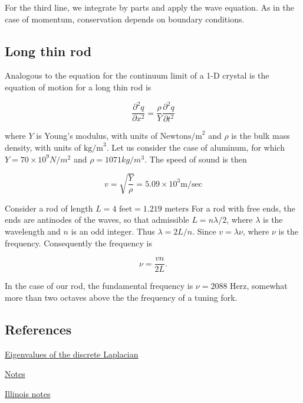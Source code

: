 For the third line, we integrate by parts and apply the wave equation.  As in the case of momentum, conservation depends on boundary conditions.

\subsection{Long thin rod}

Analogous to the equation for the continuum limit of a 1-D crystal is the equation of motion for a long thin rod is

\begin{equation}
\frac{\partial^2 q}{\partial x^2}
= \frac{\rho}{Y}\frac{\partial^2 q}{\partial t^2} 
\end{equation}

where $Y$ is Young's modulus, with units of $\text{Newtons/m}^2$ and
$\rho$ is the bulk mass density, with units of $\text{kg/m}^3$.  Let us consider the case of aluminum, for which $Y = 70\times 10^9 N/m^2$ and
$\rho = 1071 kg/m^3$.  The speed of sound is then

\begin{equation}
v = \sqrt{\frac{Y}{\rho}} = 5.09 \times 10^3 \text{m/sec}
\end{equation}

Consider a rod of length $L = 4 \text{ feet} = 1.219 \text{ meters}$
For a rod with free ends, the ends are antinodes of the waves, so that admissible $L = n\lambda/2$, where $\lambda$ is the wavelength and $n$ is an odd integer.  Thus $\lambda = 2L/n$.  Since $v = \lambda \nu$, where $\nu$ is the frequency.  Consequently the frequency is

\begin{equation}
\nu = \frac{vn}{2L} .
\end{equation}

In the case of our rod, the fundamental frequency is $\nu = 2088 \text{ Herz}$, somewhat more than two octaves above the the frequency of a tuning fork.



\subsection{References}

\begin{thebibliography}

\href{
https://en.wikipedia.org/wiki/Eigenvalues_and_eigenvectors_of_the_second_derivative}{Eigenvalues of the discrete Laplacian}

\href{http://digitalcommons.usu.edu/cgi/viewcontent.cgi?article=1004&context=foundation_wave}{Notes}

\href{https://courses.physics.illinois.edu/phys193/Lecture_Notes/Vibrating_Rod/Longitudinally_Vibrating_Singing_Rod.pdf}{Illinois notes}

\end{thebibliography}